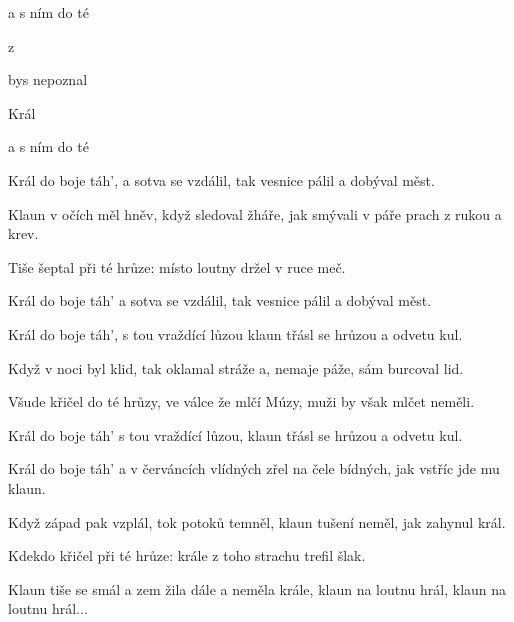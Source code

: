 

      


\zs
{}       

a s ním do té   

     z   

bys nepoznal   
\ks

\zr
{} 

  

Král       

a s ním do té       
\kr

\zs
Král do boje táh', a sotva se vzdálil, tak vesnice pálil a dobýval měst.

Klaun v očích měl hněv, když sledoval žháře, jak smývali v páře prach z rukou a krev.
\ks

\zr
Tiše šeptal při té hrůze:  místo loutny držel v ruce meč.

Král do boje táh' a sotva se vzdálil, tak vesnice pálil a dobýval měst.
\kr

\zs
Král do boje táh', s tou vraždící lůzou klaun třásl se hrůzou a odvetu kul.

Když v noci byl klid, tak oklamal stráže a, nemaje páže, sám burcoval lid.
\ks

\zr
Všude křičel do té hrůzy, ve válce že mlčí Múzy, muži by však mlčet neměli.

Král do boje táh' s tou vraždící lůzou, klaun třásl se hrůzou a odvetu kul.
\kr

\zs
Král do boje táh' a v červáncích vlídných zřel na čele bídných, jak vstříc jde mu klaun.

Když západ pak vzplál, tok potoků temněl, klaun tušení neměl, jak zahynul král.
\ks

\zr
Kdekdo křičel při té hrůze:  krále z toho strachu trefil šlak.

Klaun tiše se smál a zem žila dále a neměla krále, klaun na loutnu hrál, klaun na loutnu hrál...
\kr

\kp
